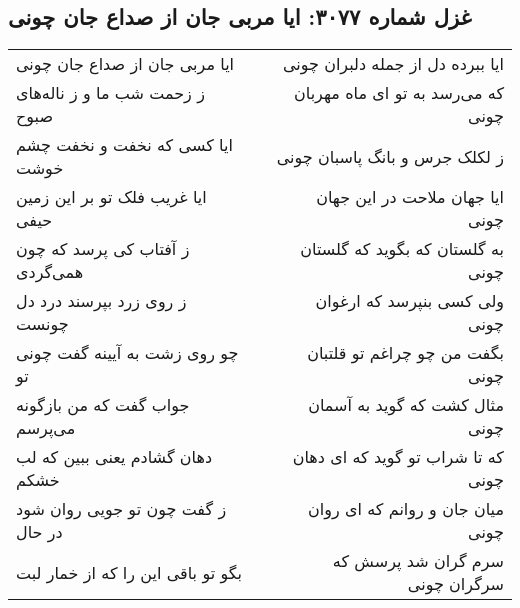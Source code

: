 \begin{center}
\section*{غزل شماره ۳۰۷۷: ایا مربی جان از صداع جان چونی}
\label{sec:3077}
\begin{longtable}{l p{0.5cm} r}
ایا مربی جان از صداع جان چونی
&&
ایا ببرده دل از جمله دلبران چونی
\\
ز زحمت شب ما و ز ناله‌های صبوح
&&
که می‌رسد به تو ای ماه مهربان چونی
\\
ایا کسی که نخفت و نخفت چشم خوشت
&&
ز لکلک جرس و بانگ پاسبان چونی
\\
ایا غریب فلک تو بر این زمین حیفی
&&
ایا جهان ملاحت در این جهان چونی
\\
ز آفتاب کی پرسد که چون همی‌گردی
&&
به گلستان که بگوید که گلستان چونی
\\
ز روی زرد بپرسند درد دل چونست
&&
ولی کسی بنپرسد که ارغوان چونی
\\
چو روی زشت به آیینه گفت چونی تو
&&
بگفت من چو چراغم تو قلتبان چونی
\\
جواب گفت که من بازگونه می‌پرسم
&&
مثال کشت که گوید به آسمان چونی
\\
دهان گشادم یعنی ببین که لب خشکم
&&
که تا شراب تو گوید که ای دهان چونی
\\
ز گفت چون تو جویی روان شود در حال
&&
میان جان و روانم که ای روان چونی
\\
بگو تو باقی این را که از خمار لبت
&&
سرم گران شد پرسش که سرگران چونی
\\
\end{longtable}
\end{center}
